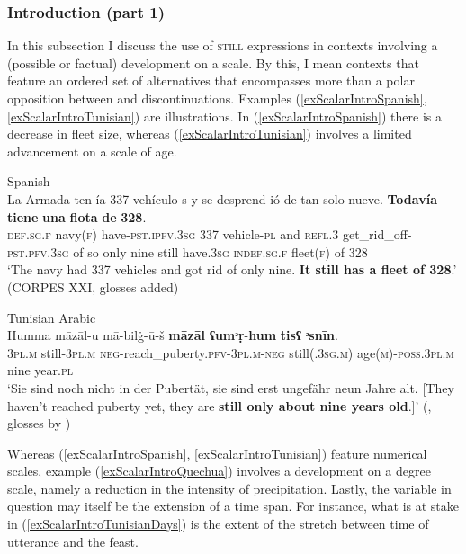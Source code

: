 \subsubsection{Introduction (part 1)}
In this subsection I discuss the use of \textsc{still} expressions in contexts involving a (possible or factual) development on a scale. By this, I mean contexts that feature an ordered set of alternatives that encompasses more than a polar opposition between  and discontinuations. Examples (\ref{exScalarIntroSpanish}, \ref{exScalarIntroTunisian}) are illustrations. In (\ref{exScalarIntroSpanish}) there is a decrease in fleet size, whereas (\ref{exScalarIntroTunisian}) involves a limited advancement on a scale of age.


\begin{exe}
		\ex Spanish \label{exScalarIntroSpanish}\\
		\gll La Armada ten-ía 337 vehículo-s y se desprend-ió de tan solo nueve. \textbf{Todavía} \textbf{tiene} \textbf{una} \textbf{flota} \textbf{de} \textbf{328}.\\
\textsc{def}.\textsc{sg}.\textsc{f} navy(\textsc{f}) have-\textsc{pst}.\textsc{ipfv}.3\textsc{sg} 337 vehicle-\textsc{pl} and \textsc{refl}.3 get\_rid\_off-\textsc{pst}.\textsc{pfv}.3\textsc{sg} of so only nine still have.3\textsc{sg} \textsc{indef}.\textsc{sg}.\textsc{f} fleet(\textsc{f}) of 328\\
	\glt \lq The navy had 337 vehicles and got rid of only nine. \textbf{It still has a fleet of 328}.\rq{ }(CORPES XXI,  glosses added)

	\ex Tunisian Arabic\label{exScalarIntroTunisian}\\
	\gll Humma māzāl-u mā-bilġ-ū-š \textbf{māzāl} \textbf{ʕumᵊṛ}-\textbf{hum} \textbf{tisʕ} \textbf{ᵊsnīn}.\\
	3\textsc{pl}.\textsc{m} still-3\textsc{pl}.\textsc{m} \textsc{neg}-reach\_puberty.\textsc{pfv}-3\textsc{pl}.\textsc{m}-\textsc{neg} still(.3\textsc{sg}.\textsc{m}) age(\textsc{m})-\textsc{poss}.3\textsc{pl}.\textsc{m} nine year.\textsc{pl}\\
	\glt \lq Sie sind noch nicht in der Pubertät, sie sind erst ungefähr neun Jahre alt. [They haven’t reached puberty yet, they are \textbf{still only about nine years old}.]\rq{ }(\cite[220–221]{RittBenmimoun2011}, glosses by \cite{FischerEtAlTunisian})	
\end{exe}

Whereas (\ref{exScalarIntroSpanish}, \ref{exScalarIntroTunisian}) feature numerical scales, example (\ref{exScalarIntroQuechua}) involves a development on a degree scale, namely a reduction in the intensity of precipitation. Lastly, the variable in question may itself be the extension of a time span. For instance, what is at stake in (\ref{exScalarIntroTunisianDays}) is the extent of the stretch between time of utterance and the feast.
 
